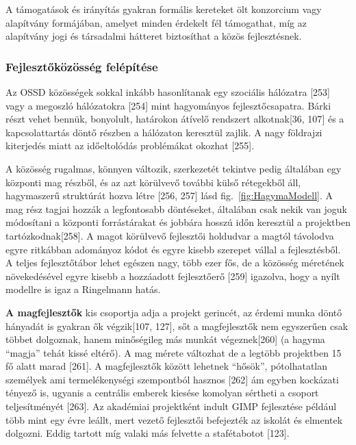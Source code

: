 \documentclass[12pt,magyar,a4paper,oneside]{scrreprt}
\begin{document}
A támogatások és irányítás gyakran formális kereteket ölt konzorcium
vagy alapítvány formájában, amelyet minden érdekelt fél támogathat, míg
az alapítvány jogi és társadalmi hátteret biztosíthat a közös
fejlesztésnek.

\hypertarget{fejlesztux151kuxf6zuxf6ssuxe9g-feluxe9puxedtuxe9se}{%
\subsubsection{Fejlesztőközösség
felépítése}\label{fejlesztux151kuxf6zuxf6ssuxe9g-feluxe9puxedtuxe9se}}

Az OSSD közösségek sokkal inkább hasonlítanak egy szociális hálózatra
{[}253{]} vagy a megoszló hálózatokra {[}254{]} mint hagyományos
fejlesztőcsapatra. Bárki részt vehet bennük, bonyolult, határokon
átívelő rendszert alkotnak{[}36, 107{]} és a kapcsolattartás döntő
részben a hálózaton keresztül zajlik. A nagy földrajzi kiterjedés miatt
az időeltolódás problémákat okozhat {[}255{]}.

A közösség rugalmas, könnyen változik, szerkezetét tekintve pedig
általában egy központi mag részből, és az azt körülvevő további külső
rétegekből áll, hagymaszerű struktúrát hozva létre {[}256, 257{]} lásd
fig.~\ref{fig:HagymaModell}. A mag rész tagjai hozzák a legfontosabb
döntéseket, általában csak nekik van joguk módosítani a központi
forrástárakat és jobbára hosszú időn keresztül a projektben
tartózkodnak{[}258{]}. A magot körülvevő fejlesztői holdudvar a magtól
távolodva egyre ritkábban adományoz kódot és egyre kisebb szerepet
vállal a fejlesztésből. A teljes fejlesztőtábor lehet egészen nagy, több
ezer fős, de a közösség méretének növekedésével egyre kisebb a
hozzáadott fejlesztőerő {[}259{]} igazolva, hogy a nyílt modellre is
igaz a Ringelmann hatás.

\textbf{A magfejlesztők} kis csoportja adja a projekt gerincét, az
érdemi munka döntő hányadát is gyakran ők végzik{[}107, 127{]}, sőt a
magfejlesztők nem egyszerűen csak többet dolgoznak, hanem minőségileg
más munkát végeznek{[}260{]} (a hagyma ``magja'' tehát kissé eltérő). A
mag mérete változhat de a legtöbb projektben 15 fő alatt marad
{[}261{]}. A magfejlesztők között lehetnek ``hősök'', pótolhatatlan
személyek ami termelékenységi szempontból hasznos {[}262{]} ám egyben
kockázati tényező is, ugyanis a centrális emberek kiesése komolyan
sértheti a csoport teljesítményét {[}263{]}. Az akadémiai projektként
indult GIMP fejlesztése például több mint egy évre leállt, mert vezető
fejlesztői befejezték az iskolát és elmentek dolgozni. Eddig tartott míg
valaki más felvette a stafétabotot {[}123{]}.
\end{document}
